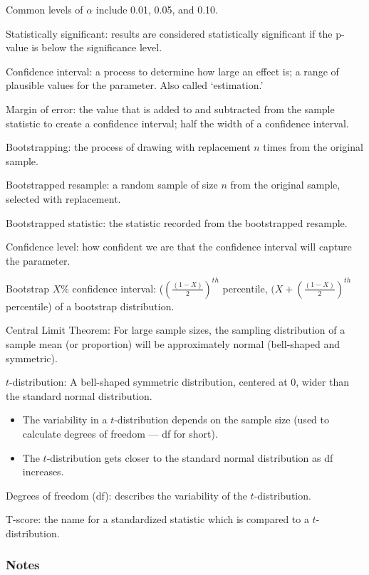\documentclass[
]{report}
\providecommand{\tightlist}{%
  \setlength{\itemsep}{0pt}\setlength{\parskip}{0pt}}
\newcommand{\rgi}{\hspace{24pt}}  %
\begin{document}
\rgi Common levels of \(\alpha\) include 0.01, 0.05, and 0.10.

Statistically significant: results are considered statistically significant if the p-value is below the significance level.

Confidence interval: a process to determine how large an effect is; a range of plausible values for the parameter. Also called `estimation.'

Margin of error: the value that is added to and subtracted from the sample statistic to create a confidence interval; half the width of a confidence interval.

Bootstrapping: the process of drawing with replacement \(n\) times from the original sample.

Bootstrapped resample: a random sample of size \(n\) from the original sample, selected with replacement.

Bootstrapped statistic: the statistic recorded from the bootstrapped resample.

Confidence level: how confident we are that the confidence interval will capture the parameter.

Bootstrap \(X\)\% confidence interval: (\((\frac{(1-X)}{2})^{th}\) percentile, \((X+(\frac{(1-X)}{2})^{th}\) percentile) of a bootstrap distribution.

Central Limit Theorem: For large sample sizes, the sampling distribution of a sample mean (or proportion) will be approximately normal (bell-shaped and symmetric).

\(t\)-distribution: A bell-shaped symmetric distribution, centered at 0, wider than the standard normal distribution.

\begin{itemize}
\tightlist
\item
  The variability in a \(t\)-distribution depends on the sample size (used to calculate degrees of freedom --- df for short).
\item
  The \(t\)-distribution gets closer to the standard normal distribution as df increases.
\end{itemize}

Degrees of freedom (df): describes the variability of the \(t\)-distribution.

T-score: the name for a standardized statistic which is compared to a \(t\)-distribution.

\hypertarget{notes-24}{%
\subsubsection*{Notes}\label{notes-24}}
\end{document}
